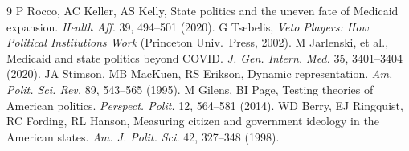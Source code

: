 \documentclass[9pt,twoside]{pnas-new}
\begin{document}

\showmatmethods

\begin{thebibliography}{9}
 P Rocco, AC Keller, AS Kelly, State politics and the uneven fate of Medicaid expansion. \emph{Health Aff.} 39, 494--501 (2020).
 G Tsebelis, \emph{Veto Players: How Political Institutions Work} (Princeton Univ.\ Press, 2002).
 M Jarlenski, et al., Medicaid and state politics beyond COVID. \emph{J. Gen. Intern. Med.} 35, 3401--3404 (2020).
 JA Stimson, MB MacKuen, RS Erikson, Dynamic representation. \emph{Am. Polit. Sci. Rev.} 89, 543--565 (1995).
 M Gilens, BI Page, Testing theories of American politics. \emph{Perspect. Polit.} 12, 564--581 (2014).
 WD Berry, EJ Ringquist, RC Fording, RL Hanson, Measuring citizen and government ideology in the American states. \emph{Am. J. Polit. Sci.} 42, 327--348 (1998).
\end{thebibliography}
\end{document}
